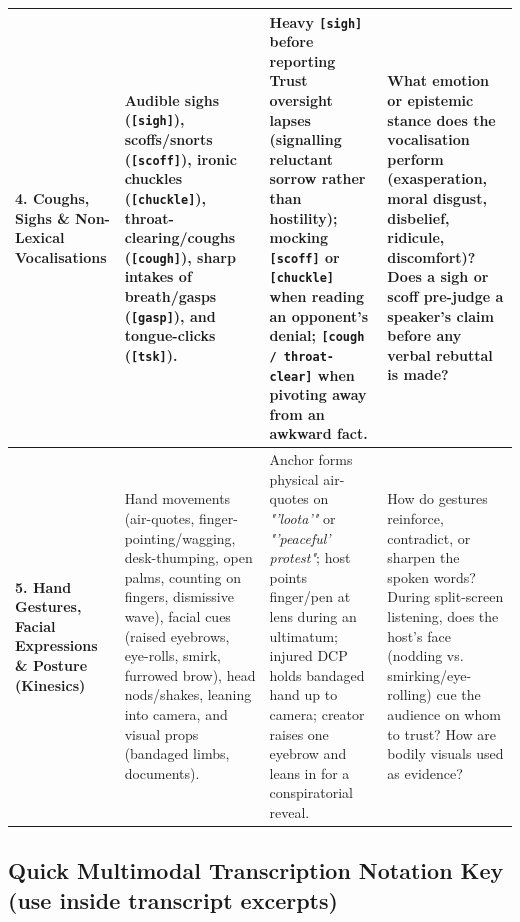 \documentclass[10pt,a4paper]{article}
\begin{document}
\begin{longtable}{|p{}|p{}|p{}|p{}|}
\textbf{4. Coughs, Sighs \& Non-Lexical Vocalisations} & Audible sighs (\texttt{[sigh]}), scoffs/snorts (\texttt{[scoff]}), ironic chuckles (\texttt{[chuckle]}), throat-clearing/coughs (\texttt{[cough]}), sharp intakes of breath/gasps (\texttt{[gasp]}), and tongue-clicks (\texttt{[tsk]}). & Heavy \texttt{[sigh]} before reporting Trust oversight lapses (signalling reluctant sorrow rather than hostility); mocking \texttt{[scoff]} or \texttt{[chuckle]} when reading an opponent's denial; \texttt{[cough / throat-clear]} when pivoting away from an awkward fact. & What emotion or epistemic stance does the vocalisation perform (exasperation, moral disgust, disbelief, ridicule, discomfort)? Does a sigh or scoff pre-judge a speaker's claim before any verbal rebuttal is made? \\ \hline
\textbf{5. Hand Gestures, Facial Expressions \& Posture (Kinesics)} & Hand movements (air-quotes, finger-pointing/wagging, desk-thumping, open palms, counting on fingers, dismissive wave), facial cues (raised eyebrows, eye-rolls, smirk, furrowed brow), head nods/shakes, leaning into camera, and visual props (bandaged limbs, documents). & Anchor forms physical air-quotes on \textit{"'loota'"} or \textit{"'peaceful' protest"}; host points finger/pen at lens during an ultimatum; injured DCP holds bandaged hand up to camera; creator raises one eyebrow and leans in for a conspiratorial reveal. & How do gestures reinforce, contradict, or sharpen the spoken words? During split-screen listening, does the host's face (nodding vs. smirking/eye-rolling) cue the audience on whom to trust? How are bodily visuals used as evidence? \\ \hline
\end{longtable}

\subsection*{Quick Multimodal Transcription Notation Key (use inside transcript excerpts)}
\end{document}
